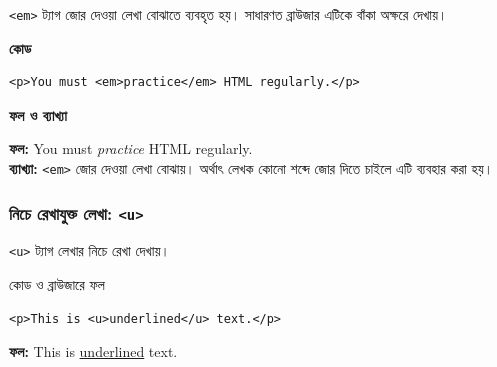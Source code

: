 \texttt{<em>} ট্যাগ জোর দেওয়া লেখা বোঝাতে ব্যবহৃত হয়। সাধারণত ব্রাউজার এটিকে বাঁকা অক্ষরে দেখায়।

\par\noindent
\begin{minipage}[t]{.54\linewidth}\vspace{0pt}\small
\textbf{\color{chFourTeal}কোড}\par
\begin{verbatim}
<p>You must <em>practice</em> HTML regularly.</p>
\end{verbatim}

\par\smallskip
\end{minipage}\hfill
\begin{minipage}[t]{.42\linewidth}\vspace{0pt}\small
\textbf{\color{chFourTeal}ফল ও ব্যাখ্যা}\par
\textbf{ফল:} You must \textit{practice} HTML regularly.\\
\textbf{ব্যাখ্যা:} \texttt{<em>} জোর দেওয়া লেখা বোঝায়। অর্থাৎ লেখক কোনো শব্দে জোর দিতে চাইলে এটি ব্যবহার করা হয়।
\par\smallskip
\end{minipage}\par


\subsubsection{নিচে রেখাযুক্ত লেখা: \texttt{<u>}}

\texttt{<u>} ট্যাগ লেখার নিচে রেখা দেখায়।

\begin{chFourWholeExample}{কোড ও ব্রাউজারে ফল}
\noindent
\begin{minipage}[t]{.50\linewidth}\vspace{0pt}

\begin{verbatim}
<p>This is <u>underlined</u> text.</p>
\end{verbatim}

\end{minipage}\hfill
\begin{minipage}[t]{.46\linewidth}\vspace{0pt}
\textbf{ফল:} This is \underline{underlined} text.\\
\end{minipage}
\end{chFourWholeExample}


